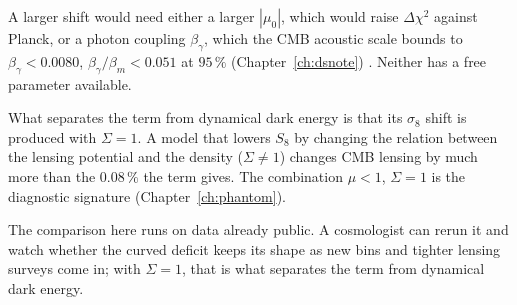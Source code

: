A larger shift would need either a larger $|\mu_0|$, which would raise $\Delta\chi^2$ against Planck, or a photon coupling $\beta_\gamma$, which the
CMB acoustic scale bounds to $\beta_\gamma<0.0080$, $\beta_\gamma/\beta_m<0.051$ at $95\,\%$ (Chapter~\ref{ch:dsnote}) \measured. Neither has a free
parameter available. \interp

What separates the term from dynamical dark energy is that its $\sigma_8$ shift is produced with $\Sigma=1$. A model that lowers $S_8$ by changing the
relation between the lensing potential and the density ($\Sigma\neq1$) changes CMB lensing by much more than the $0.08\,\%$ the term gives. The
combination $\mu<1$, $\Sigma=1$ is the diagnostic signature (Chapter~\ref{ch:phantom}). \prediction

The comparison here runs on data already public. A cosmologist can rerun it and watch whether the curved deficit keeps its shape as new bins and tighter lensing surveys come in; with $\Sigma=1$, that is what separates the term from dynamical dark energy.
